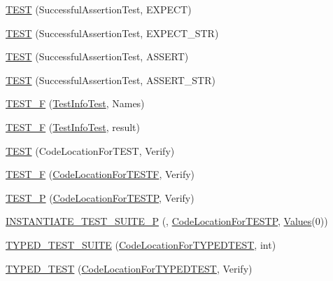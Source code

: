 \begin{DoxyCompactItemize}
\mbox{\hyperlink{namespacetesting_af6c8f998f934372e5687d3998068e5e4}{T\+E\+ST}} (Successful\+Assertion\+Test, E\+X\+P\+E\+CT)
\item 
\mbox{\hyperlink{namespacetesting_a9b1e4b53f277d25e6d6413a0004481bb}{T\+E\+ST}} (Successful\+Assertion\+Test, E\+X\+P\+E\+C\+T\+\_\+\+S\+TR)
\item 
\mbox{\hyperlink{namespacetesting_afbe4c8233faff6eba04902b3cb041632}{T\+E\+ST}} (Successful\+Assertion\+Test, A\+S\+S\+E\+RT)
\item 
\mbox{\hyperlink{namespacetesting_a83dfac108c207258287b9f7aa9171e8a}{T\+E\+ST}} (Successful\+Assertion\+Test, A\+S\+S\+E\+R\+T\+\_\+\+S\+TR)
\item 
\mbox{\hyperlink{namespacetesting_acd53db89097aba1468724d6446069b1e}{T\+E\+S\+T\+\_\+F}} (\mbox{\hyperlink{classtesting_1_1_test_info_test}{Test\+Info\+Test}}, Names)
\item 
\mbox{\hyperlink{namespacetesting_ab00e29c00b3e29cdfa21d23b79dd3776}{T\+E\+S\+T\+\_\+F}} (\mbox{\hyperlink{classtesting_1_1_test_info_test}{Test\+Info\+Test}}, result)
\item 
\mbox{\hyperlink{namespacetesting_af597d0ad4de0197141b78e9c1035e491}{T\+E\+ST}} (Code\+Location\+For\+T\+E\+ST, Verify)
\item 
\mbox{\hyperlink{namespacetesting_a782ec43081903a0aaa6d009218eba2a8}{T\+E\+S\+T\+\_\+F}} (\mbox{\hyperlink{classtesting_1_1_code_location_for_t_e_s_t_f}{Code\+Location\+For\+T\+E\+S\+TF}}, Verify)
\item 
\mbox{\hyperlink{namespacetesting_af05768b7e2f14652d2c4f274ba1a5544}{T\+E\+S\+T\+\_\+P}} (\mbox{\hyperlink{classtesting_1_1_code_location_for_t_e_s_t_p}{Code\+Location\+For\+T\+E\+S\+TP}}, Verify)
\item 
\mbox{\hyperlink{namespacetesting_a91b2d3c4e8c89bcec13270ae8585d549}{I\+N\+S\+T\+A\+N\+T\+I\+A\+T\+E\+\_\+\+T\+E\+S\+T\+\_\+\+S\+U\+I\+T\+E\+\_\+P}} (, \mbox{\hyperlink{classtesting_1_1_code_location_for_t_e_s_t_p}{Code\+Location\+For\+T\+E\+S\+TP}}, \mbox{\hyperlink{namespacetesting_abd3c87b40c2a0663691c9b617ed5fcc2}{Values}}(0))
\item 
\mbox{\hyperlink{namespacetesting_a47a357ed1077c1b52ba654b7753714bc}{T\+Y\+P\+E\+D\+\_\+\+T\+E\+S\+T\+\_\+\+S\+U\+I\+TE}} (\mbox{\hyperlink{classtesting_1_1_code_location_for_t_y_p_e_d_t_e_s_t}{Code\+Location\+For\+T\+Y\+P\+E\+D\+T\+E\+ST}}, int)
\item 
\mbox{\hyperlink{namespacetesting_a400c572f732b06e836d6b3a5adfc4cf7}{T\+Y\+P\+E\+D\+\_\+\+T\+E\+ST}} (\mbox{\hyperlink{classtesting_1_1_code_location_for_t_y_p_e_d_t_e_s_t}{Code\+Location\+For\+T\+Y\+P\+E\+D\+T\+E\+ST}}, Verify)

\end{DoxyCompactItemize}
